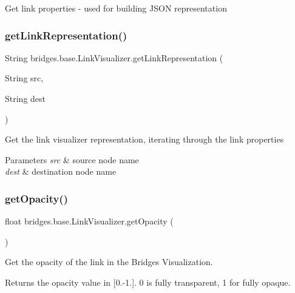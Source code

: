 Get link properties -\/ used for building J\+S\+ON representation \mbox{\label{classbridges_1_1base_1_1_link_visualizer_af0a196babb49f49be7d8ce88f6b2f8db}} 
\subsubsection{\texorpdfstring{get\+Link\+Representation()}{getLinkRepresentation()}}
{\footnotesize\ttfamily String bridges.\+base.\+Link\+Visualizer.\+get\+Link\+Representation (\begin{DoxyParamCaption}\item[{String}]{src,  }\item[{String}]{dest }\end{DoxyParamCaption})}

Get the link visualizer representation, iterating through the link properties


\begin{DoxyParams}{Parameters}
{\em src} & source node name \\
\hline
{\em dest} & destination node name \\
\hline
\end{DoxyParams}
\mbox{\label{classbridges_1_1base_1_1_link_visualizer_a07cdd435a54e4b612ad63614f2a27a4a}} 
\subsubsection{\texorpdfstring{get\+Opacity()}{getOpacity()}}
{\footnotesize\ttfamily float bridges.\+base.\+Link\+Visualizer.\+get\+Opacity (\begin{DoxyParamCaption}{ }\end{DoxyParamCaption})}



Get the opacity of the link in the Bridges Visualization. 

\begin{DoxyReturn}{Returns}
the opacity value in \mbox{[}0.-\/1.\mbox{]}. 0 is fully transparent, 1 for fully opaque. 
\end{DoxyReturn}
\mbox{\label{classbridges_1_1base_1_1_link_visualizer_af1592d2a8664b00c1a51fdc0f8d1860a}} 
